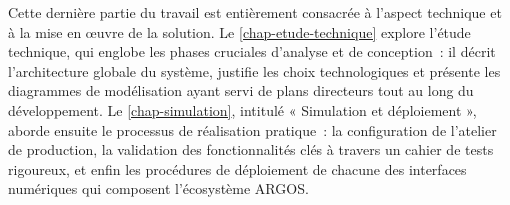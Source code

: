 
Cette dernière partie du travail est entièrement consacrée à l'aspect technique et à la mise en œuvre de la solution. Le \cref{chap-etude-technique} explore l'étude technique, qui englobe les phases cruciales d'analyse et de conception~: il décrit l'architecture globale du système, justifie les choix technologiques et présente les diagrammes de modélisation ayant servi de plans directeurs tout au long du développement. Le \cref{chap-simulation}, intitulé « Simulation et déploiement », aborde ensuite le processus de réalisation pratique~: la configuration de l'atelier de production, la validation des fonctionnalités clés à travers un cahier de tests rigoureux, et enfin les procédures de déploiement de chacune des interfaces numériques qui composent l'écosystème ARGOS.

